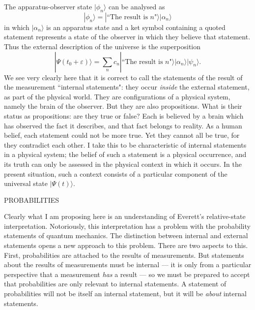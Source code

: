 \documentclass[12pt,a4paper,reqno]{article}
\renewcommand{\(}{\left(}
\renewcommand{\)}{\right)}
\renewcommand{\epsilon}{\varepsilon}
\newcommand{\<}{\langle}
\renewcommand{\>}{\rangle}
\theoremstyle{plain} %
\theoremstyle{definition}
\theoremstyle{remark}
\begin{document}
The apparatus-observer state $|\phi_n\>$ can be analysed as
\[
|\phi_n\> = |\text{``The result is $n$"}\>|\alpha_n\>
\]
in which $|\alpha_n\>$ is an apparatus state and a ket symbol containing
a quoted statement represents a state of the observer in which they
believe that statement. Thus the external description of the universe is
the superposition
\[
|\Psi(t_0+\epsilon)\> = 
\sum_n c_n |\text{``The result is $n$"}\>|\alpha_n\>|\psi_n\>.
\]
We see very clearly here that it is correct to call the statements of the result of the
measurement ``internal statements": they occur 
\emph{inside} the external statement, as part of the physical
world. They are configurations of a physical system, namely the brain of
the observer. But they are also propositions. What is their status as propositions:
are they true or false? Each is believed by a brain which has observed the fact it
describes, and that fact belongs to reality. As a
human belief, each statement could not be more true. Yet they cannot all
be true, for they contradict each other. I take this to be
characteristic of internal statements in a physical system; the
belief of such a statement is a physical occurrence, and its truth can
only be assessed in the physical context in which it occurs. In the
present situation, such a context consists of a particular component of
the universal state $|\Psi(t)\>$. 

\medskip
\begin{center}
PROBABILITIES
\end{center}

Clearly what I am proposing here is an understanding of Everett's relative-state
interpretation. Notoriously, this interpretation has a problem with the
probability statements of quantum mechanics. The distinction between
internal and external statements opens a new approach to this problem.
There are two aspects to this. First, probabilities are attached to the
results of measurements. But statements about the results of measurements
must be internal --- it is only from a particular perspective that a
measurement \emph{has} a result --- so we must be prepared to accept
that probabilities are only relevant to internal statements. A statement
of probabilities will not be itself an internal statement, but it will
be \emph{about} internal statements.
\end{document}
